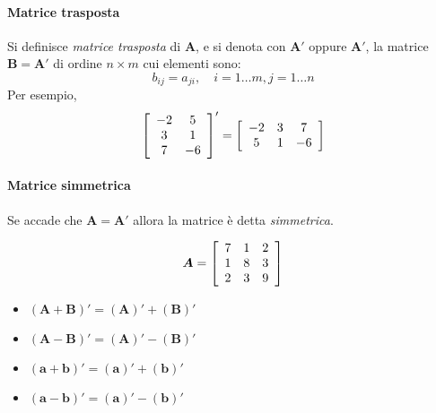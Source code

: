 \paragraph{Matrice trasposta}

Si definisce \emph{matrice trasposta} di $\boldsymbol{A}$, e si
denota con $\boldsymbol{A}'$ oppure $\boldsymbol{A}'$, la matrice
$\boldsymbol{B} = \boldsymbol{A}'$ di ordine $n \times m$ cui
elementi sono:
\[
b_{ij} = a_{ji},  \quad        i = 1 \dots m, j = 1 \dots n
\]
Per esempio,
\begin{displaymath}
\left[ \begin{array}{c c}
-2 & 5\\
3 & 1\\
7 & -6
\end{array}
 \right]'=
\left[ \begin{array}{c c c}
-2 & 3 & 7\\
5 & 1 & -6
\end{array}
 \right]
\end{displaymath}

\paragraph{Matrice simmetrica}

Se accade che $\boldsymbol{A} = \boldsymbol{A}'$ allora la matrice
{\`e} detta \emph{simmetrica}.

\begin{displaymath}
\boldsymbol{A} =  \left[ \begin{array}{c c c}
7 & 1 & 2\\
1 & 8 & 3\\
2 & 3 & 9 \end{array} \right]
\end{displaymath}

\begin{itemize}

\item $(\boldsymbol{A} + \boldsymbol{B})' = (\boldsymbol{A})' +
(\boldsymbol{B})'$\quad

\item $(\boldsymbol{A} - \boldsymbol{B})' = (\boldsymbol{A})' -
(\boldsymbol{B})'$\quad

\item $(\boldsymbol{a} + \boldsymbol{b})' = (\boldsymbol{a})' +
(\boldsymbol{b})'$\quad

\item $(\boldsymbol{a} - \boldsymbol{b})' = (\boldsymbol{a})' -
(\boldsymbol{b})'$\quad

\end{itemize}

